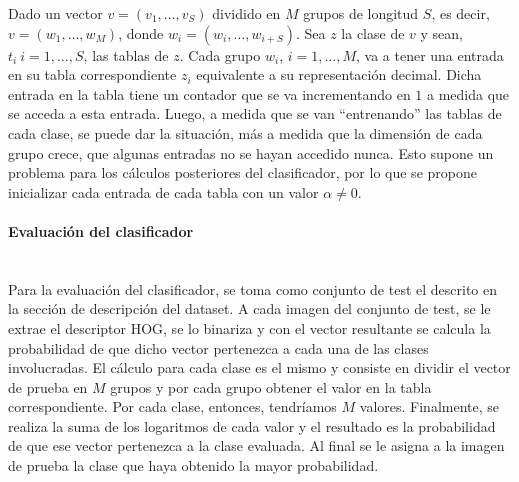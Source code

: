 			Dado un vector $v=(v_1, \dots, v_S)$ dividido en $M$ grupos de longitud $S$, es decir, $v=(w_1,\dots,w_M)$, donde $w_i=(w_i,\dots,w_{i+S})$. Sea $z$ la clase de $v$ y sean, $t_i~ i=1, \dots, S$, las tablas de $z$. Cada grupo $w_i$, $i=1, \dots, M$, va a tener una entrada en su tabla correspondiente $z_i$ equivalente a su representación decimal. Dicha entrada en la tabla tiene un contador que se va incrementando en $1$ a medida que se acceda a esta entrada. Luego, a medida que se van ``entrenando'' las tablas de cada clase, se puede dar la situación, más a medida que la dimensión de cada grupo crece, que algunas entradas no se hayan accedido nunca. Esto supone un problema para los cálculos pos\-te\-rio\-res del clasificador, por lo que se propone inicializar cada entrada de cada tabla con un valor $\alpha \neq 0$. 

		\paragraph{Evaluación del clasificador} ~\\

			Para la evaluación del clasificador, se toma como conjunto de test el descrito en la sección de descripción del dataset. A cada imagen del conjunto de test, se le extrae el descriptor HOG, se lo binariza y con el vector resultante se calcula la probabilidad de que dicho vector pertenezca a cada una de las clases involucradas. El cálculo para cada clase es el mismo y consiste en dividir el vector de prueba en $M$ grupos y por cada grupo obtener el valor en la tabla correspondiente. Por cada clase, entonces, tendríamos $M$ valores. Finalmente, se realiza la suma de los logaritmos de cada valor y el resultado es la probabilidad de que ese vector pertenezca a la clase evaluada. Al final se le asigna a la imagen de prueba la clase que haya obtenido la mayor probabilidad.

